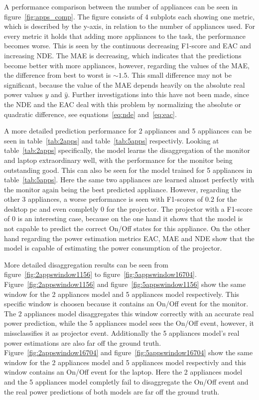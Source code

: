 \documentclass[sigconf]{acmart}
\begin{document}
A performance comparison between the number of appliances can be seen in figure~\ref{fig:apps_comp}.
The figure consists of 4 subplots each showing one metric, which is described by the y-axis, in relation to the number of appliances 
used.
For every metric it holds that adding more appliances to the task, the performance becomes worse.
This is seen by the continuous decreasing F1-score and EAC and increasing NDE.
The MAE is decreasing, which indicates that the predictions become better with more appliances, however, 
regarding the values of the MAE, the difference from best to worst is $\sim 1.5$. This small difference may not be significant,
because the value of the MAE depends heavily on the absolute real power values $y$ and $\hat{y}$. Further investigations 
into this have not been made, since the NDE and the EAC deal with this problem by normalizing the absolute or quadratic difference, 
see equations~\ref{eq:nde} and~\ref{eq:eac}.

A more detailed prediction performance for 2 appliances and 5 appliances can be seen in table~\ref{tab:2apps} and table~\ref{tab:5apps} respectivly.
Looking at table~\ref{tab:2apps} specifically, the model learns the disaggregation of the monitor and laptop extraordinary well,
with the performance for the monitor being outstanding good. This can also be seen for the model trained for 5 appliances in table~\ref{tab:5apps}.
Here the same two appliances are learned almost perfectly with the monitor again being the best predicted appliance.
However, regarding the other 3 appliances, a worse performance is seen with F1-scores of 0.2 for 
the desktop pc and even completly 0 for the projector. 
The projector with a F1-score of 0 is an interesting case, because on the one hand it shows that the model is not capable to predict the correct 
On/Off states for this appliance. On the other hand regarding the power estimation metrics EAC, MAE and NDE show that the model 
is capable of estimating the power consumption of the projector.

More detailed disaggregation results can be seen from figure~\ref{fig:2appswindow1156} to figure~\ref{fig:5appswindow16704}. 
Figure~\ref{fig:2appswindow1156} and figure~\ref{fig:5appswindow1156} show the same window for the 2 appliances model and 5 appliances model respectively.
This specific window is choosen because it contains an On/Off event for the monitor. 
The 2 appliances model disaggregates this window correctly with an accurate real power prediction, while the 5 appliances model sees the On/Off event, however, it missclassifies it 
as projector event. Additionally the 5 appliances model's real power estimations are also far off the ground truth.
Figure~\ref{fig:2appswindow16704} and figure~\ref{fig:5appswindow16704} show the same window for the 2 appliances model and 5 appliances model respectivly and this 
window contains an On/Off event for the laptop.
Here the 2 appliances model and the 5 appliances model completly fail to disaggregate the On/Off event and the real power predictions 
of both models are far off the ground truth.
\end{document}
